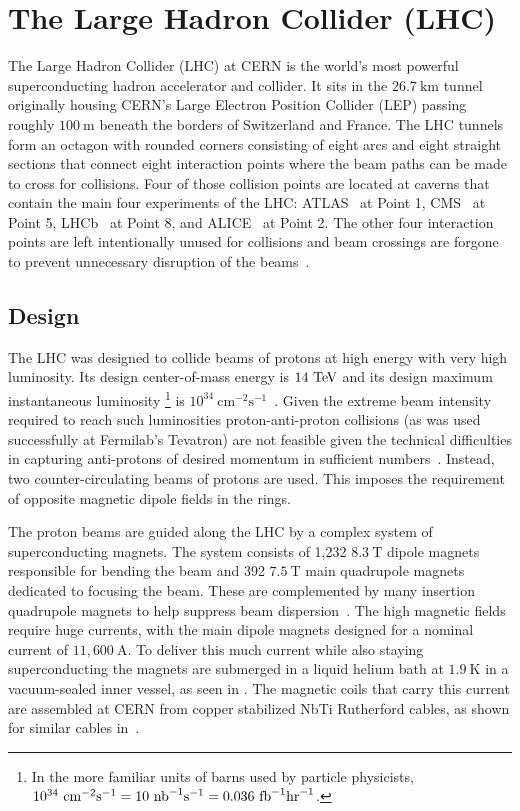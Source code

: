 \chapter{The Large Hadron Collider (LHC)}\label{chapter:LHC}

The Large Hadron Collider (\Gls{LHC}) at CERN is the world's most powerful superconducting hadron accelerator and collider.
It sits in the $26.7~\mathrm{km}$ tunnel originally housing CERN's Large Electron Position Collider (LEP) passing roughly $100~\mathrm{m}$ beneath the borders of Switzerland and France.
The LHC tunnels form an octagon with rounded corners consisting of eight arcs and eight straight sections that connect eight \glspl{interaction point} where the beam paths can be made to cross for collisions.
Four of those collision points are located at caverns that contain the main four experiments of the LHC: ATLAS~\cite{PERF-2007-01} at Point 1, CMS~\cite{CMS:2008} at Point 5, LHCb~\cite{LHCb:2008} at Point 8, and ALICE~\cite{ALICE:2008} at Point 2.
The other four interaction points are left intentionally unused for collisions and beam crossings are forgone to prevent unnecessary disruption of the beams~\cite{Evans:2008}.

\section{Design}

The LHC was designed to collide beams of protons at high energy with very high luminosity.
Its design center-of-mass energy is $14~\text{Te\kern-0.1em V}{}$ and its design maximum instantaneous luminosity%
\footnote{In the more familiar units of barns used by particle physicists, $10^{34}~\mathrm{cm}^{-2}\mathrm{s}^{-1}=10~\mathrm{nb}^{-1}\mathrm{s}^{-1}=0.036~\mathrm{fb}^{-1}\mathrm{hr}^{-1}$.}
is $10^{34}~\mathrm{cm}^{-2}\mathrm{s}^{-1}$~\cite{Bruning:782076,Evans:2008}.
Given the extreme beam intensity required to reach such luminosities proton-anti-proton collisions (as was used successfully at Fermilab's Tevatron) are not feasible given the technical difficulties in capturing anti-protons of desired momentum in sufficient numbers~\cite{Oliveros:2017xrw}.
Instead, two counter-circulating beams of protons are used.
This imposes the requirement of opposite magnetic dipole fields in the rings.

The proton beams are guided along the LHC by a complex system of superconducting magnets.
The system consists of 1,232 $8.3~\mathrm{T}$ dipole magnets responsible for bending the beam and 392 $7.5~\mathrm{T}$ main quadrupole magnets dedicated to focusing the beam.
These are complemented by many insertion quadrupole magnets to help suppress beam dispersion~\cite{Rossi:2003,Rossi:2004}.
The high magnetic fields require huge currents, with the main dipole magnets designed for a nominal current of $11,600~\mathrm{A}$.
To deliver this much current while also staying superconducting the magnets are submerged in a liquid helium bath at $1.9~\mathrm{K}$ in a vacuum-sealed inner vessel, as seen in .
The magnetic coils that carry this current are assembled at CERN from copper stabilized NbTi Rutherford cables, as shown for similar cables in~\cite{CERN-FOOTAGE-2016-014-001}.

